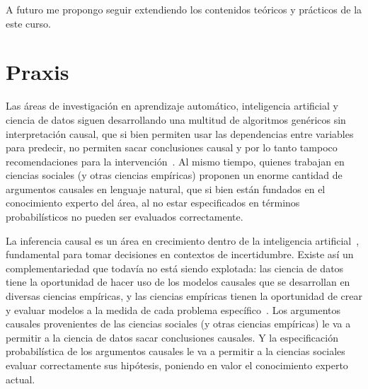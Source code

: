 \documentclass[a4paper,11pt]{book}
\theoremstyle{definition}
\begin{document}

A futuro me propongo seguir extendiendo los contenidos te\'oricos y pr\'acticos de la este curso.

\section{Praxis}

Las \'areas de investigaci\'on en aprendizaje autom\'atico, inteligencia artificial y ciencia de datos siguen desarrollando una multitud de algoritmos gen\'ericos sin interpretaci\'on causal, que si bien permiten usar las dependencias entre variables para predecir, no permiten sacar conclusiones causal y por lo tanto tampoco recomendaciones para la intervenci\'on~\cite{pearl2009-causality}.
%
Al mismo tiempo, quienes trabajan en ciencias sociales (y otras ciencias emp\'iricas) proponen un enorme cantidad de argumentos causales en lenguaje natural, que si bien est\'an fundados en el conocimiento experto del \'area, al no estar especificados en t\'erminos probabil\'isticos no pueden ser evaluados correctamente.


La inferencia causal es un \'area en crecimiento dentro de la inteligencia artificial~\cite{pearl2009-causality, peters2017-causalInference}, fundamental para tomar decisiones en contextos de incertidumbre.
%
Existe as\'i un complementariedad que todav\'ia no est\'a siendo explotada: las ciencia de datos tiene la oportunidad de hacer uso de los modelos causales que se desarrollan en diversas ciencias emp\'iricas, y las ciencias emp\'iricas tienen la oportunidad de crear y evaluar modelos a la medida de cada problema espec\'ifico~\cite{murphy-pmlBook1,murphy-pmlBook2, Bishop2013, Bishop2006}.
%
Los argumentos causales provenientes de las ciencias sociales (y otras ciencias emp\'iricas) le va a permitir a la ciencia de datos sacar conclusiones causales.
%
Y la especificaci\'on probabil\'istica de los argumentos causales le va a permitir a la ciencias sociales evaluar correctamente sus hip\'otesis, poniendo en valor el conocimiento experto actual.

%
\end{document}
